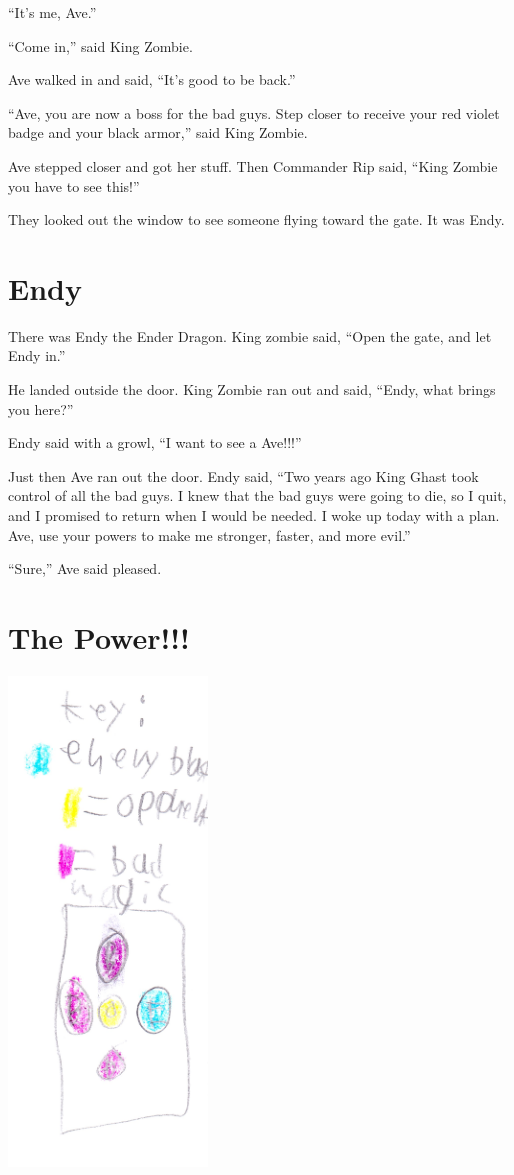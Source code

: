 \documentclass[booklet, twoside, 12pt]{krantz}
\begin{document}
``It's me, Ave.''

``Come in,'' said King Zombie.

Ave walked in and said, ``It's good to be back.''

``Ave, you are now a boss for the bad guys. Step closer to receive your
red violet badge and your black armor,'' said King Zombie.

Ave stepped closer and got her stuff. Then Commander Rip said, ``King
Zombie you have to see this!''

They looked out the window to see someone flying toward the gate. It was
Endy.

\hypertarget{endy}{%
\section{Endy}\label{endy}}

There was Endy the Ender Dragon. King zombie said, ``Open the gate, and
let Endy in.''

He landed outside the door. King Zombie ran out and said, ``Endy, what
brings you here?''

Endy said with a growl, ``I want to see a Ave!!!''

Just then Ave ran out the door. Endy said, ``Two years ago King Ghast
took control of all the bad guys. I knew that the bad guys were going to
die, so I quit, and I promised to return when I would be needed. I woke
up today with a plan. Ave, use your powers to make me stronger, faster,
and more evil.''

``Sure,'' Ave said pleased.

\hypertarget{the-power}{%
\section{The Power!!!}\label{the-power}}

\includegraphics[width=2.08333in,height=\textheight]{img/four-bad-guys/key.jpg}
\end{document}
